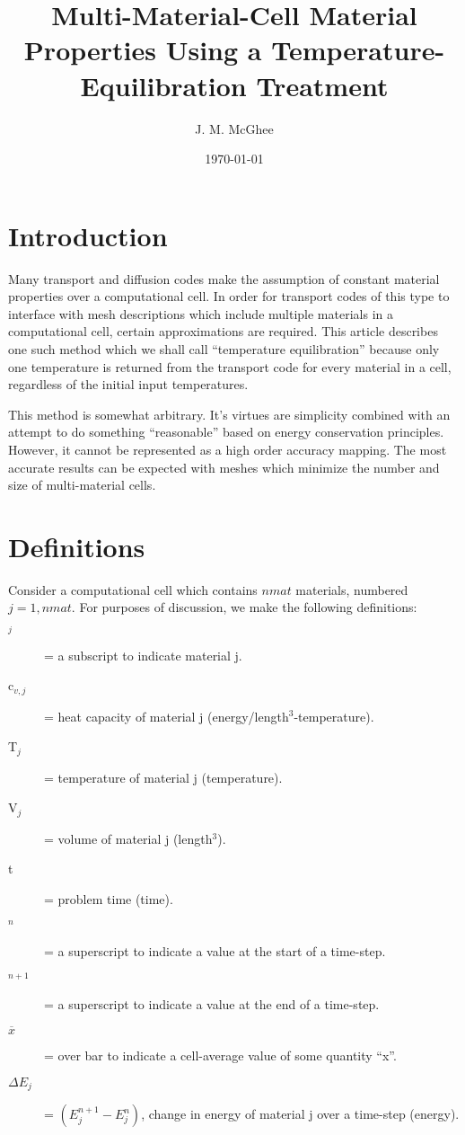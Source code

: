 \documentclass[12pt]{article}
\begin{document}
\title{Multi-Material-Cell Material Properties Using a
	Temperature-Equilibration Treatment}
\author{J. M. McGhee}
\date{\today}

\maketitle

\newpage

\section{Introduction}

Many transport and diffusion codes make the assumption of constant material
properties over a computational cell.  In order for transport codes
of this type to interface with mesh descriptions which include multiple
materials in a computational cell, certain approximations are required.
This article describes one such method which we shall call
``temperature equilibration'' because only one temperature is returned
from the transport code for every material in a cell, regardless of
the initial input temperatures.

This method is somewhat arbitrary. It's virtues are simplicity 
combined with an attempt to do something
``reasonable'' based on energy conservation principles.
 However, it cannot be represented as a high order
accuracy mapping. The most accurate results can be expected with meshes which
minimize the number and size of multi-material cells. 


\section{Definitions}

Consider a computational cell which contains $nmat$  materials, numbered
$j = 1,nmat$. For purposes
of discussion, we make the following definitions:

\begin{description}
\item[$_j$] = a subscript to indicate material j.
\item[c$_{v,j}$] = heat capacity of material j (energy/length$^3$-temperature).
\item[T$_j$] = temperature of material j (temperature).
\item[V$_j$] = volume of material j (length$^3$).
\item[t] = problem time (time).
\item[$^n$] = a superscript to indicate a value at the start of a time-step.
\item[$^{n+1}$] = a superscript to indicate a value at the end of a time-step.
\item[$\overline{x}$]=  over bar to indicate a cell-average value of some
 quantity ``x''.
\item[$\Delta E_{j}$] = $(E_{j}^{n+1} - E_{j}^{n})$, change in energy of 
	material j over a time-step (energy).
\end{description}
\end{document}

